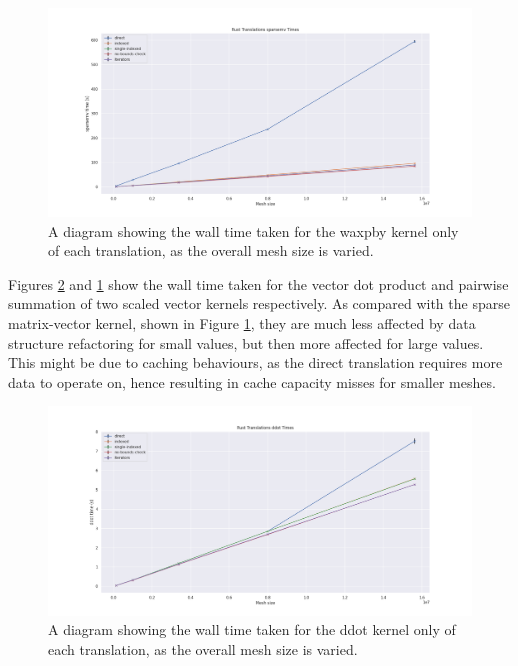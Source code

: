 \begin{figure}[H]
    \centering
    \includegraphics[width=\textwidth]{images/3_translation/translations_sparsemv_line.png}
    \caption{A diagram showing the wall time taken for the waxpby kernel only of each translation, as the overall mesh size is varied.}
    \label{fig:translations_waxpby_line}
\end{figure}

Figures \ref{fig:translations_ddot_line} and \ref{fig:translations_waxpby_line} show the wall time taken for the vector dot product and pairwise summation of two scaled vector kernels respectively. As compared with the sparse matrix-vector kernel, shown in Figure \ref{fig:translations_waxpby_line}, they are much less affected by data structure refactoring for small values, but then more affected for large values. This might be due to caching behaviours, as the direct translation requires more data to operate on, hence resulting in cache capacity misses for smaller meshes.

\begin{figure}[H]
    \centering
    \includegraphics[width=\textwidth]{images/3_translation/translations_ddot_line.png}
    \caption{A diagram showing the wall time taken for the ddot kernel only of each translation, as the overall mesh size is varied.}
    \label{fig:translations_ddot_line}
\end{figure}

